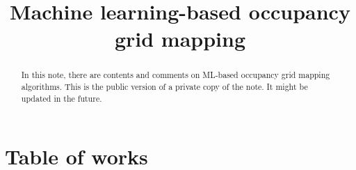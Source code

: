 \documentclass[onecolumn]{IEEEtran}
\begin{document}
	\title{Machine learning-based occupancy grid mapping}
	\author{
	}
	\maketitle
	\begin{abstract}
		In this note, there are contents and comments on ML-based occupancy grid mapping algorithms. 
		This is the public version of a private copy of the note. It might be updated in the future. 
	\end{abstract}
	\section{Table of works}
	\clearpage
\end{document}
